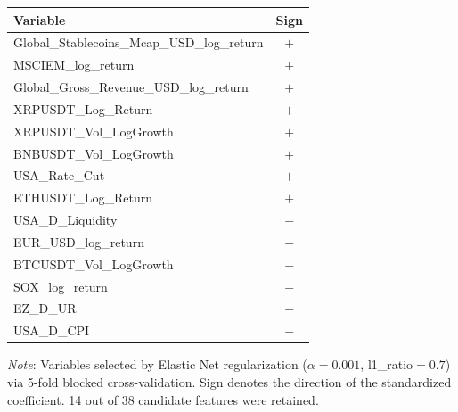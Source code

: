 \begin{tabular}{lc}
  \toprule
  \textbf{Variable} & \textbf{Sign} \\ 
  \midrule
  Global\_Stablecoins\_Mcap\_USD\_log\_return & $+$ \\ 
  MSCIEM\_log\_return & $+$ \\ 
  Global\_Gross\_Revenue\_USD\_log\_return & $+$ \\ 
  XRPUSDT\_Log\_Return & $+$ \\ 
  XRPUSDT\_Vol\_LogGrowth & $+$ \\ 
  BNBUSDT\_Vol\_LogGrowth & $+$ \\ 
  USA\_Rate\_Cut & $+$ \\ 
  ETHUSDT\_Log\_Return & $+$ \\ 
  USA\_D\_Liquidity & $-$ \\ 
  EUR\_USD\_log\_return & $-$ \\ 
  BTCUSDT\_Vol\_LogGrowth & $-$ \\ 
  SOX\_log\_return & $-$ \\ 
  EZ\_D\_UR & $-$ \\ 
  USA\_D\_CPI & $-$ \\ 
  \bottomrule
\end{tabular}
\par\vspace{4pt}
\begin{minipage}{\linewidth}
  \footnotesize \textit{Note}: Variables selected by Elastic Net regularization ($\alpha=0.001$, l1\_ratio$=0.7$) via 5-fold blocked cross-validation. Sign denotes the direction of the standardized coefficient. 14 out of 38 candidate features were retained.
\end{minipage}